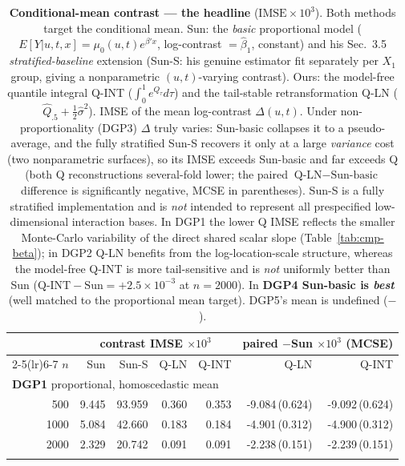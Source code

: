 \begin{table}[t]\centering\small
\caption{\textbf{Conditional-mean contrast --- the headline} ($\mathrm{IMSE}\times10^{3}$). Both methods target the conditional mean. Sun: the \emph{basic} proportional model ($E[Y|u,t,x]=\mu_0(u,t)e^{\beta'x}$, log-contrast $=\widehat\beta_1$, constant) and his Sec.~3.5 \emph{stratified-baseline} extension (Sun-S: his genuine estimator fit separately per $X_1$ group, giving a nonparametric $(u,t)$-varying contrast). Ours: the model-free quantile integral Q-INT ($\int_0^1 e^{Q_\tau}d\tau$) and the tail-stable retransformation Q-LN ($\widehat Q_{.5}+\tfrac12\widehat\sigma^2$). IMSE of the mean log-contrast $\Delta(u,t)$. Under non-proportionality (DGP3) $\Delta$ truly varies: Sun-basic collapses it to a pseudo-average, and the fully stratified Sun-S recovers it only at a large \emph{variance} cost (two nonparametric surfaces), so its IMSE exceeds Sun-basic and far exceeds Q (both Q reconstructions several-fold lower; the paired $\text{Q-LN}-\text{Sun-basic}$ difference is significantly negative, MCSE in parentheses). Sun-S is a fully stratified implementation and is \emph{not} intended to represent all prespecified low-dimensional interaction bases. In DGP1 the lower Q IMSE reflects the smaller Monte-Carlo variability of the direct shared scalar slope (Table~\ref{tab:cmp-beta}); in DGP2 Q-LN benefits from the log-location-scale structure, whereas the model-free Q-INT is more tail-sensitive and is \emph{not} uniformly better than Sun ($\text{Q-INT}-\text{Sun}=+2.5\times10^{-3}$ at $n{=}2000$). In \textbf{DGP4 Sun-basic is \emph{best}} (well matched to the proportional mean target). DGP5's mean is undefined ($-$).}
\label{tab:cmp-contrast}\begin{tabular}{r rrrr rr}\toprule
&\multicolumn{4}{c}{contrast IMSE $\times10^{3}$}&\multicolumn{2}{c}{paired $-$Sun $\times10^{3}$ (MCSE)}\\
\cmidrule(lr){2-5}\cmidrule(lr){6-7}
$n$&Sun&Sun-S&Q-LN&Q-INT&Q-LN&Q-INT\\\midrule
\multicolumn{7}{l}{\textbf{DGP1} proportional, homoscedastic mean}\\
500 & 9.445 & 93.959 & 0.360 & 0.353 & -9.084\,(0.624) & -9.092\,(0.624)\\
1000 & 5.084 & 42.660 & 0.183 & 0.184 & -4.901\,(0.312) & -4.900\,(0.312)\\
2000 & 2.329 & 20.742 & 0.091 & 0.091 & -2.238\,(0.151) & -2.239\,(0.151)\\
\addlinespace
\multicolumn{7}{l}{\textbf{DGP2} proportional mean, dispersion varies}\\

\end{tabular}
\end{table}
